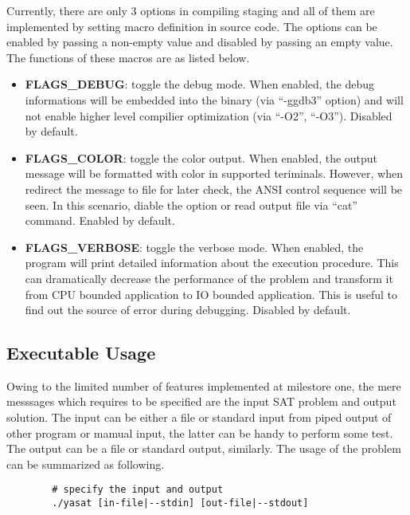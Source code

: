 \documentclass[a4paper, 11.5pt]{article}
\begin{document}
\begin{multicols}{2}
    Currently, there are only 3 options in compiling staging and all of them are implemented by
    setting macro definition in source code. The options can be enabled by passing a non-empty 
    value and disabled by passing an empty value. The functions of these macros are as listed below.
    \begin{itemize}
        \item {\bfseries FLAGS\_DEBUG}: toggle the debug mode. When enabled, the debug informations 
        will be embedded into the binary (via ``-ggdb3'' option) and will not enable higher level compilier optimization (via ``-O2'', ``-O3''). Disabled by default.
        \item {\bfseries FLAGS\_COLOR}: toggle the color output. When enabled, the output message will be formatted with color in supported teriminals. However, when redirect the message to file for later check, the ANSI control sequence will be seen. In this scenario, diable the option or read output file via ``cat'' command. Enabled by default.
        \item {\bfseries FLAGS\_VERBOSE}: toggle the verbose mode. When enabled, the program will
        print detailed information about the execution procedure. This can dramatically decrease the performance of the problem and transform it from CPU bounded application to IO bounded application. This is useful to find out the source of error during debugging. Disabled by default.
    \end{itemize}

    \subsection{Executable Usage}

    Owing to the limited number of features implemented at milestore one, the mere messsages
    which requires to be specified are the input SAT problem and output solution. The input can be 
    either a file or standard input from piped output of other program or mamual input, the latter can 
    be handy to perform some test. The output can be a file or standard output, similarly. The usage of the problem can be summarized as following.
    \\

    \begin{tcolorbox}[breakable, blanker, width=\linewidth]
      \begin{verbatim}
        # specify the input and output
        ./yasat [in-file|--stdin] [out-file|--stdout]


\end{verbatim}
\end{tcolorbox}
\end{multicols}
\end{document}
